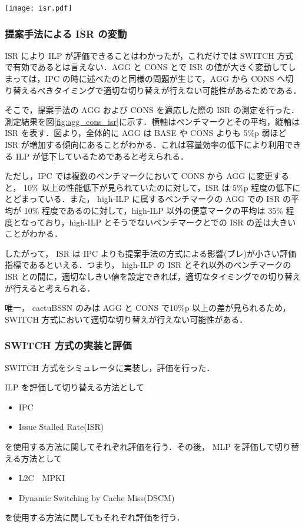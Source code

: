\documentclass[twocolumn]{jsarticle}
\begin{document}
  \begin{figure*}[ht]
    \centering
    \texttt{[image: isr.pdf]}
    \caption{提案手法による ISR の変化}  
    \label{fig:agg_cons_isr}
  \end{figure*}

  \subsubsection{提案手法による ISR の変動}
  ISR により ILP が評価できることはわかったが，これだけでは SWITCH 方式で有効であるとは言えない．AGG と CONS とで ISR の値が大きく変動してしまっては，IPC の時に述べたのと同様の問題が生じて，AGG から CONS へ切り替えるべきタイミングで適切な切り替えが行えない可能性があるためである．

  そこで，提案手法の AGG および CONS を適応した際の ISR の測定を行った．測定結果を図\ref{fig:agg_cons_isr}に示す．横軸はベンチマークとその平均，縦軸は ISR を表す．図より，全体的に AGG は BASE や CONS よりも 5\%p 弱ほど ISR が増加する傾向にあることがわかる．これは容量効率の低下により利用できる ILP が低下しているためであると考えられる．

  ただし，IPC では複数のベンチマークにおいて CONS から AGG に変更すると， 10\% 以上の性能低下が見られていたのに対して，ISR は 5\%p 程度の低下にとどまっている．また， high-ILP に属するベンチマークの AGG での ISR の平均が 10\% 程度であるのに対して，high-ILP 以外の便意マークの平均は 35\% 程度となっており，high-ILP とそうでないベンチマークとでの ISR の差は大きいことがわかる．
  
  したがって， ISR は IPC よりも提案手法の方式による影響(ブレ)が小さい評価指標であるといえる．つまり， high-ILP の ISR とそれ以外のベンチマークの ISR との間に，適切なしきい値を設定できれば，適切なタイミングでの切り替えが行えると考えられる．

  唯一， cactuBSSN のみは AGG と CONS で10\%p 以上の差が見られるため， SWITCH 方式において適切な切り替えが行えない可能性がある．

  \subsubsection{SWITCH 方式の実装と評価}
   SWITCH 方式をシミュレータに実装し，評価を行った．

   ILP を評価して切り替える方法として
   \begin{itemize}
     \item IPC
     \item Issue Stalled Rate(ISR)
   \end{itemize}
    を使用する方法に関してそれぞれ評価を行う．その後， MLP を評価して切り替える方法として
    \begin{itemize}
      \item L2C　MPKI
      \item Dynamic Switching by Cache Miss(DSCM)
    \end{itemize}
    を使用する方法に関してもそれぞれ評価を行う．
 
\end{document}
